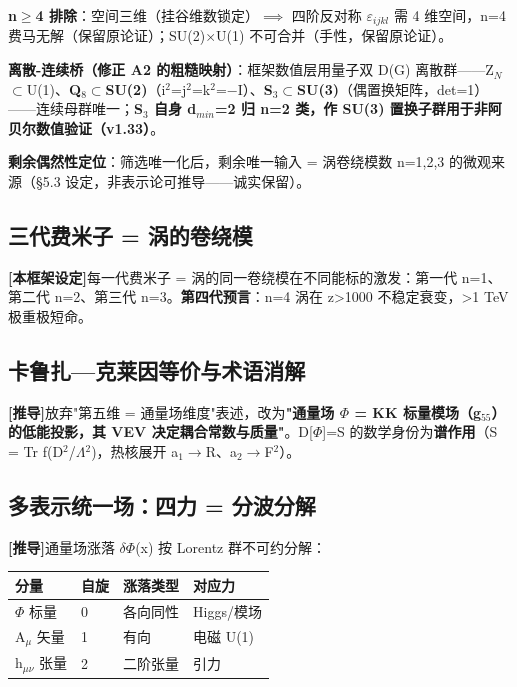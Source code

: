\documentclass[UTF8,fontset=windows]{csoarticle}
\newcommand{\mtag}[1]{\textbf{[#1]}}
\newcommand{\up}[1]{\ensuremath{^{#1}}}
\newcommand{\down}[1]{\ensuremath{_{#1}}}
\begin{document}
\textbf{n\ensuremath{\geq}4 排除}：空间三维（挂谷维数锁定）\ensuremath{\implies} 四阶反对称 \ensuremath{\varepsilon}\down{ijkl} 需 4 维空间，n=4 费马无解（保留原论证）；SU(2)\ensuremath{\times}U(1) 不可合并（手性，保留原论证）。

\textbf{离散-连续桥（修正 A2 的粗糙映射）}：框架数值层用量子双 D(G) 离散群------Z\down{N}\ensuremath{\subset}U(1)、\textbf{Q\down{8}\ensuremath{\subset}SU(2)}（i\up{2}=j\up{2}=k\up{2}=\ensuremath{-}I）、\textbf{S\down{3}\ensuremath{\subset}SU(3)}（偶置换矩阵，det=1）------连续母群唯一；\textbf{S\down{3} 自身 d\down{min}=2 归 n=2 类，作 SU(3) 置换子群用于非阿贝尔数值验证（v1.33）}。

\textbf{剩余偶然性定位}：筛选唯一化后，剩余唯一输入 = 涡卷绕模数 n=1,2,3 的微观来源（\S{}5.3 设定，非表示论可推导------诚实保留）。

\subsection{三代费米子 = 涡的卷绕模}

\mtag{本框架设定}每一代费米子 = 涡的同一卷绕模在不同能标的激发：第一代 n=1、第二代 n=2、第三代 n=3。\textbf{第四代预言}：n=4 涡在 z>1000 不稳定衰变，>1 TeV 极重极短命。

\subsection{卡鲁扎---克莱因等价与术语消解}

\mtag{推导}放弃"第五维 = 通量场维度"表述，改为\textbf{"通量场 \ensuremath{\Phi} = KK 标量模场（g\down{55}）的低能投影，其 VEV 决定耦合常数与质量"}。D[\ensuremath{\Phi}]=S 的数学身份为\textbf{谱作用}（S = Tr f(D\up{2}/\ensuremath{\Lambda}\up{2})，热核展开 a\down{1}\ensuremath{\to}R、a\down{2}\ensuremath{\to}F\up{2}）。

\subsection{多表示统一场：四力 = 分波分解}

\mtag{推导}通量场涨落 \ensuremath{\delta}\ensuremath{\Phi}(x) 按 Lorentz 群不可约分解：

\begin{table}[htbp]
\centering
\small
\begin{tabularx}{\textwidth}{@{}lXXX@{}}
\toprule
分量 & 自旋 & 涨落类型 & 对应力 \\
\midrule
\ensuremath{\Phi} 标量 & 0 & 各向同性 & Higgs/模场 \\
A\down{\mu{}} 矢量 & 1 & 有向 & 电磁 U(1) \\
h\down{\mu{}\nu{}} 张量 & 2 & 二阶张量 & 引力 \\
\bottomrule
\end{tabularx}
\end{table}
\end{document}

